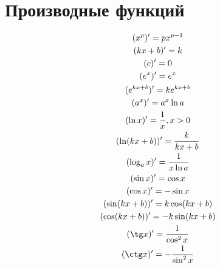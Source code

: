 \documentclass[14pt, fleqn]{extarticle}
\begin{document}
\section*{Производные функций}
\noindent\begin{gather*}
    (x^p)' = px^{p-1}\\
    (kx+b)' = k\\
    (c)'=0\\
    (e^x)'=e^x\\
    (e^{kx+b})'=ke^{kx+b}\\
    (a^x)'=a^x \ln a\\
    (\ln x)'= \frac{1}{x}, x>0\\
    (\ln (kx+b))'= \frac{k}{kx+b}\\
    (\log_a x)'=\frac{1}{x \ln a}\\
    (\sin x)'=\cos x\\
    (\cos x)' = -\sin x\\
    (\sin (kx+b))'=k\cos (kx+b)\\
    (\cos (kx+b))' = -k\sin (kx+b)\\
    (\tg x)' = \frac{1}{\cos^2 x}\\
    (\ctg x)' = -\frac{1}{\sin^2 x}
\end{gather*}

\end{document}
